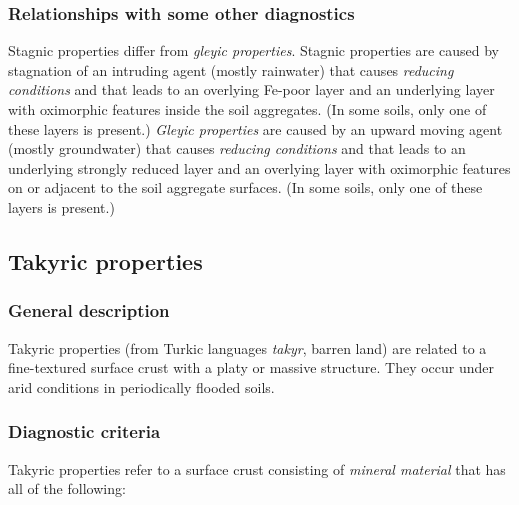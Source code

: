 \documentclass[
  letterpaper,
  DIV=11,
  numbers=noendperiod]{scrreprt}
\begin{document}
\hypertarget{relationships-with-some-other-diagnostics-48}{%
\subsubsection{Relationships with some other
diagnostics}\label{relationships-with-some-other-diagnostics-48}}

Stagnic properties differ from \emph{gleyic properties}. Stagnic
properties are caused by stagnation of an intruding agent (mostly
rainwater) that causes \emph{reducing conditions} and that leads to an
overlying Fe-poor layer and an underlying layer with oximorphic features
inside the soil aggregates. (In some soils, only one of these layers is
present.) \emph{Gleyic properties} are caused by an upward moving agent
(mostly groundwater) that causes \emph{reducing conditions} and that
leads to an underlying strongly reduced layer and an overlying layer
with oximorphic features on or adjacent to the soil aggregate surfaces.
(In some soils, only one of these layers is present.)

\hypertarget{takyric-properties}{%
\subsection{Takyric properties}\label{takyric-properties}}

\hypertarget{general-description-52}{%
\subsubsection{General description}\label{general-description-52}}

Takyric properties (from Turkic languages \emph{takyr}, barren land) are
related to a fine-textured surface crust with a platy or massive
structure. They occur under arid conditions in periodically flooded
soils.

\hypertarget{diagnostic-criteria-54}{%
\subsubsection{Diagnostic criteria}\label{diagnostic-criteria-54}}

Takyric properties refer to a surface crust consisting of \emph{mineral
material} that has all of the following:
\end{document}
